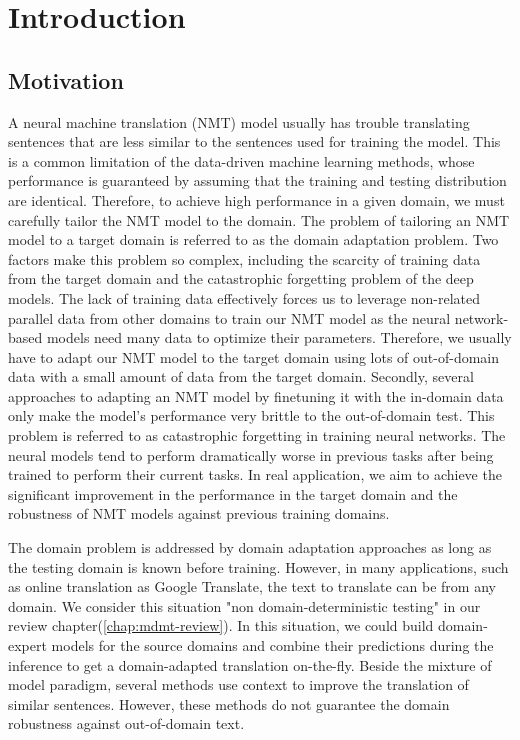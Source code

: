 \chapter{Introduction}
\section{Motivation}
A neural machine translation (NMT) model usually has trouble translating sentences that are less similar to the sentences used for training the model. This is a common limitation of the data-driven machine learning methods, whose performance is guaranteed by assuming that the training and testing distribution are identical. Therefore, to achieve high performance in a given domain, we must carefully tailor the NMT model to the domain. The problem of tailoring an NMT model to a target domain is referred to as the domain adaptation problem. Two factors make this problem so complex, including the scarcity of training data from the target domain and the catastrophic forgetting problem of the deep models. The lack of training data effectively forces us to leverage non-related parallel data from other domains to train our NMT model as the neural network-based models need many data to optimize their parameters. Therefore, we usually have to adapt our NMT model to the target domain using lots of out-of-domain data with a small amount of data from the target domain. Secondly, several approaches to adapting an NMT model by finetuning it with the in-domain data only make the model's performance very brittle to the out-of-domain test. This problem is referred to as catastrophic forgetting in training neural networks. The neural models tend to perform dramatically worse in previous tasks after being trained to perform their current tasks. In real application, we aim to achieve the significant improvement in the performance in the target domain and the robustness of NMT models against previous training domains.

The domain problem is addressed by domain adaptation approaches as long as the testing domain is known before training. However, in many applications, such as online translation as Google Translate, the text to translate can be from any domain. We consider this situation "non domain-deterministic testing" in our review chapter(\ref{chap:mdmt-review}). In this situation, we could build domain-expert models for the source domains and combine their predictions during the inference \citep{Saunders19domain} to get a domain-adapted translation on-the-fly. Beside the mixture of model paradigm, several methods use context to improve the translation of similar sentences. However, these methods do not guarantee the domain robustness against out-of-domain text.

